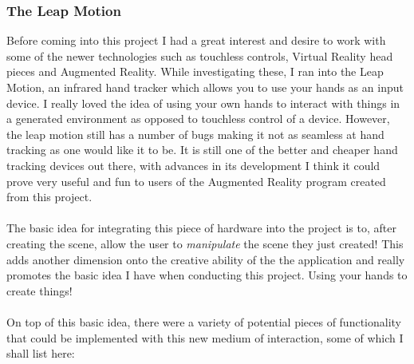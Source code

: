 \documentclass[11pt]{article}
\begin{document}
\subsubsection{The Leap Motion}
Before coming into this project I had a great interest and desire to work with
some of the newer technologies such as touchless controls, Virtual Reality 
head pieces and Augmented Reality. While investigating these, I ran into the
Leap Motion, an infrared hand tracker which allows you to use your hands as
an input device. I really loved the idea of using your own hands to interact
with things in a generated environment as opposed to touchless control of a device.
However, the leap motion still has a number of bugs making it not as 
seamless at  
hand tracking as one would like it to be. It is still one of the better and 
cheaper hand tracking devices out there, with advances in its development I think
it could prove very useful and fun to users of the Augmented Reality program 
created from this project.\\
\\
The basic idea for integrating this piece of hardware into the project is to,
after creating the scene, allow the user to \textit{manipulate} the
scene they just created! This adds another dimension onto the creative
ability of the the application and really promotes the basic idea I have when
conducting this project. Using your hands to create things! \\
\\
On top of this basic idea, there were a variety of potential pieces of 
functionality that could be implemented with this new medium of 
interaction, some of which I shall list here:
\end{document}
